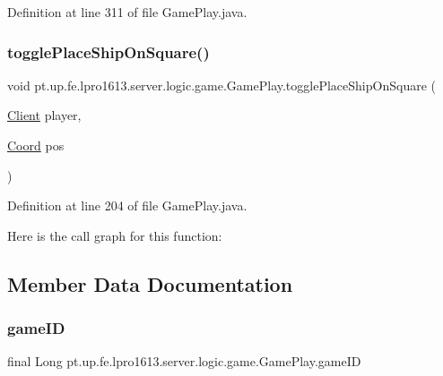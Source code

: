 Definition at line 311 of file Game\+Play.\+java.

\hypertarget{classpt_1_1up_1_1fe_1_1lpro1613_1_1server_1_1logic_1_1game_1_1_game_play_a6fcb90a31171ecfc5a9ed4f41b2396ee}{}\label{classpt_1_1up_1_1fe_1_1lpro1613_1_1server_1_1logic_1_1game_1_1_game_play_a6fcb90a31171ecfc5a9ed4f41b2396ee} 
\subsubsection{\texorpdfstring{toggle\+Place\+Ship\+On\+Square()}{togglePlaceShipOnSquare()}}
{\footnotesize\ttfamily void pt.\+up.\+fe.\+lpro1613.\+server.\+logic.\+game.\+Game\+Play.\+toggle\+Place\+Ship\+On\+Square (\begin{DoxyParamCaption}\item[{\hyperlink{classpt_1_1up_1_1fe_1_1lpro1613_1_1server_1_1conn_1_1_client}{Client}}]{player,  }\item[{\hyperlink{classpt_1_1up_1_1fe_1_1lpro1613_1_1sharedlib_1_1utils_1_1_coord}{Coord}}]{pos }\end{DoxyParamCaption})}



Definition at line 204 of file Game\+Play.\+java.

Here is the call graph for this function\+:


\subsection{Member Data Documentation}
\hypertarget{classpt_1_1up_1_1fe_1_1lpro1613_1_1server_1_1logic_1_1game_1_1_game_play_a9866aed542d7230589214b7297c19103}{}\label{classpt_1_1up_1_1fe_1_1lpro1613_1_1server_1_1logic_1_1game_1_1_game_play_a9866aed542d7230589214b7297c19103} 
\subsubsection{\texorpdfstring{game\+ID}{gameID}}
{\footnotesize\ttfamily final Long pt.\+up.\+fe.\+lpro1613.\+server.\+logic.\+game.\+Game\+Play.\+game\+ID}



